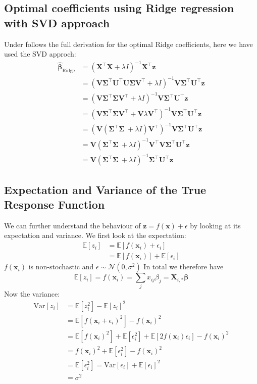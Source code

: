 \documentclass{article}
\newcommand{\EE}{\mathbb{E}}
\newcommand{\XX}{\mathbf{X}}
\newcommand{\VV}{\mathbf{V}}
\newcommand{\UU}{\mathbf{U}}
\begin{document}
\subsection{Optimal coefficients using Ridge regression with SVD approach}
\label{app_derivations:beta_ridge_with_svd}
Under follows the full derivation for the optimal Ridge coefficients, here we have used the SVD approch:
\begin{align*}
    \bm{\hat{\beta}}_\text{Ridge} &= 
    (\XX^\top\XX + \lambda I)^{-1}\XX^\top\bm{z} \\
    &=
    (\VV\mathbf{\Sigma}^\top\UU^\top\UU\mathbf{\Sigma}\VV^\top+\lambda I)^{-1}\VV\mathbf{\Sigma}^\top\UU^\top\bm{z} \\
    &=
    (\VV\mathbf{\Sigma}^\top\mathbf{\Sigma}\VV^\top+\lambda I)^{-1}\VV\mathbf{\Sigma}^\top\UU^\top\bm{z} \\
    &=
    (\VV\mathbf{\Sigma}^\top\mathbf{\Sigma}\VV^\top+\VV\lambda \VV^\top)^{-1}\VV\mathbf{\Sigma}^\top\UU^\top\bm{z} \\
    &=
    (\VV(\mathbf{\Sigma}^\top\mathbf{\Sigma}\ + \lambda I) \VV^\top)^{-1}\VV\mathbf{\Sigma}^\top\UU^\top\bm{z} \\
    &=
    \VV(\mathbf{\Sigma}^\top\mathbf{\Sigma}\ + \lambda I)^{-1} \VV^\top\VV\mathbf{\Sigma}^\top\UU^\top\bm{z} \\
    &=
    \VV(\mathbf{\Sigma}^\top\mathbf{\Sigma}\ + \lambda I)^{-1} \mathbf{\Sigma}^\top\UU^\top\bm{z} 
\end{align*}

\subsection{Expectation and Variance of the True Response Function}
\label{app_derivations:expectation_variance_true_z}
We can further understand the behaviour of $\bm{z} = f(\bm{x}) + \epsilon$ by looking at its expectation and variance. We first look at the expectation:
\begin{align*}
    \EE[z_i] &= \EE[f(\bm{x}_i) + \epsilon_i] \\
    &= \EE[f(\bm{x}_i)] + \EE[\epsilon_i] 
\end{align*}
$f(\bm{x}_i)$ is non-stochastic and $\epsilon \sim \mathcal{N}(0, \sigma^2)$
In total we therefore have
$$\EE[z_i] = f(\bm{x}_i) = \sum_{j} x_{ij}\beta_j = \mathbf{X}_{i, *}\bm{\beta}$$
Now the variance:
\begin{align*}
    \text{Var}[z_i] &= \EE[z_{i}^2] - \EE[z_i]^2 \\
    &= \EE[f(\bm{x}_i + \epsilon_i)^2] - f(\bm{x}_i)^2 \\
    &= \EE[f(\bm{x}_i)^2] + \EE[\epsilon_{i}^{2}] + \EE[2f(\bm{x}_i)\epsilon_i] - f(\bm{x}_i)^2 \\
    &= f(\bm{x}_i)^2 + \EE[\epsilon_i^2] - f(\bm{x}_i)^2 \\
    &= \EE[\epsilon_i^2] = \text{Var}[\epsilon_i] + \EE[\epsilon_i]^2 \\
    &= \sigma^2
\end{align*}
\end{document}
